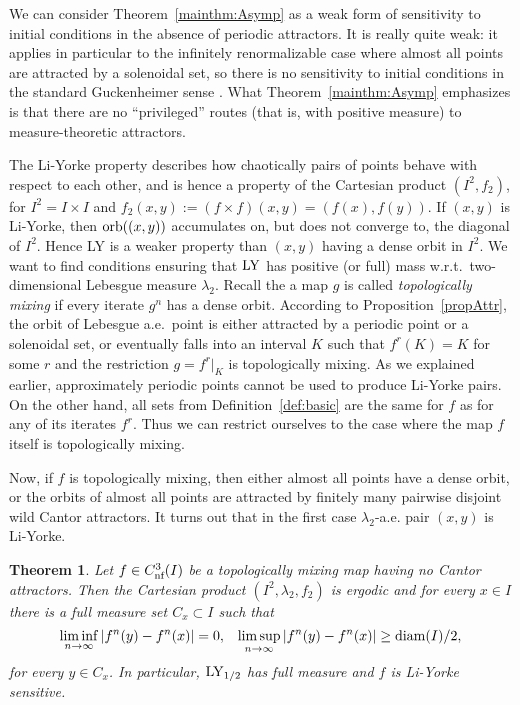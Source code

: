 \documentclass[12pt, psamsfonts, reqno]{amsart}
\newcounter{letter}
\newtheorem{maintheorem}[letter]{Theorem}
\begin{document}
We can consider Theorem~\ref{mainthm:Asymp} as a weak form of
sensitivity to initial conditions in the absence of periodic
attractors. It is really quite weak: it applies in particular to
the infinitely renormalizable case where almost all points are
attracted by a solenoidal set, so there is no sensitivity to
initial conditions in the standard Guckenheimer sense \cite{Guc}.
What Theorem~\ref{mainthm:Asymp} emphasizes is that there are no
``privileged'' routes (that is, with positive measure) to
measure-theoretic attractors.

The Li-Yorke property describes how chaotically pairs of points
behave with respect to each other, and is hence a property of the
Cartesian product $(I^2, f_2)$, for $I^2 = I \times I$ and
$f_2(x,y) := (f\times f)(x,y)=(f(x),f(y))$. If $(x,y)$ is
Li-Yorke, then ${\mathop{\rm orb}\nolimits}((x,y))$ accumulates on, but does not converge
to, the diagonal of $I^2$. Hence LY is a weaker property than
$(x,y)$ having a dense orbit in $I^2$. We want to find conditions
ensuring that ${\mathop{\rm LY}\nolimits}$ has positive (or full) mass w.r.t.\
two-dimensional Lebesgue measure $\lambda_2$. Recall the a map $g$
is called \emph{topologically mixing} if every iterate $g^n$ has a
dense orbit. According to Proposition~\ref{propAttr}, the orbit of
Lebesgue a.e.\ point is either attracted by a periodic point
or a solenoidal set, or eventually falls into an interval $K$ such
that $f^r(K)=K$ for some $r$ and the restriction $g=f^r|_K$ is
topologically mixing. As we explained earlier, approximately
periodic points cannot be used to produce Li-Yorke pairs. On the
other hand, all sets from Definition~\ref{def:basic} are the same
for $f$ as for any of its iterates $f^r$. Thus we can restrict
ourselves to the case where the map $f$ itself is topologically
mixing.

Now, if $f$ is topologically mixing, then either almost all points
have a dense orbit, or the orbits of almost all points are
attracted by finitely many pairwise disjoint wild Cantor
attractors. It turns out that in the first case $\lambda_2$-a.e.
pair $(x,y)$ is Li-Yorke.

\begin{maintheorem}\label{mainthmLY}
 Let $f\in {C^3_{\text{\rm nf}}}(I)$ be a topologically mixing map having no
 Cantor attractors. Then the Cartesian product $(I^2,\lambda_2,f_2)$
 is ergodic and for every $x\in I$ there is a
 full measure set $C_x\subset I$ such that
  $$
  \liminf_{n\to\infty} |f^n(y)- f^n(x)|=0, \;\;\;\limsup_{n\to\infty}
  |f^n(y)- f^n(x)|\geq {\mathop{\rm diam}\nolimits}(I)/2,
  $$
 for every $y\in C_x$. In particular, ${\mathop{\rm LY}\nolimits}_{1/2}$ has full measure
 and $f$ is Li-Yorke sensitive.
\end{maintheorem}
\end{document}
